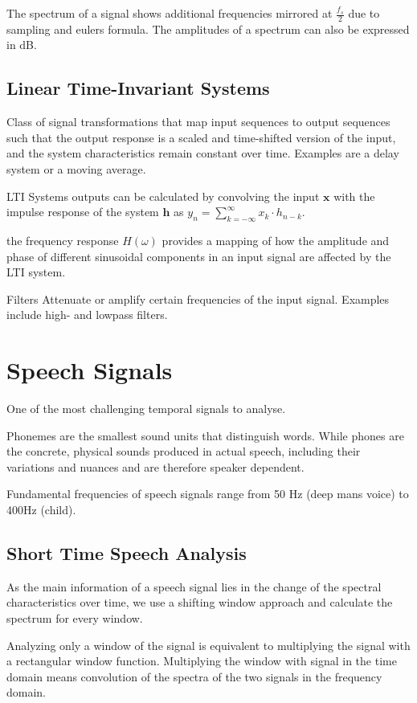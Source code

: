 \documentclass[10pt, a4paper]{article}
\begin{document}
The spectrum of a signal shows additional frequencies mirrored at $ \frac{f_s} {2} $ due to sampling and eulers formula.
The amplitudes of a spectrum can also be expressed in dB.

\subsection{Linear Time-Invariant Systems}
Class of signal transformations that map input sequences to output sequences such that the output response is a scaled and time-shifted version of the input,
and the system characteristics remain constant over time. Examples are a delay system or a moving average.

LTI Systems outputs can be calculated by convolving the input $ \textbf{x} $ with the impulse response of the system
$ \textbf{h} $ as $ y_n = \sum_{k=-\infty}^{\infty} x_k \cdot h_{n-k} $.

the frequency response $ H(\omega) $ provides a mapping of how the amplitude and phase of different sinusoidal components in an input signal are affected by the LTI system.

Filters Attenuate or amplify certain frequencies of the input signal. Examples include high- and lowpass filters.

\section{Speech Signals}
One of the most challenging temporal signals to analyse.

Phonemes are the smallest sound units that distinguish words. While phones are the concrete,
physical sounds produced in actual speech, including their variations and nuances and are therefore speaker dependent.

Fundamental frequencies of speech signals range from 50 Hz (deep mans voice) to 400Hz (child).

\subsection{Short Time Speech Analysis}
As the main information of a speech signal lies in the change of the spectral characteristics over time,
we use a shifting window approach and calculate the spectrum for every window.

Analyzing only a window of the signal is equivalent to multiplying the signal with a rectangular window function.
Multiplying the window with signal in the time domain means convolution of the spectra of the two signals in the frequency domain.
\end{document}

